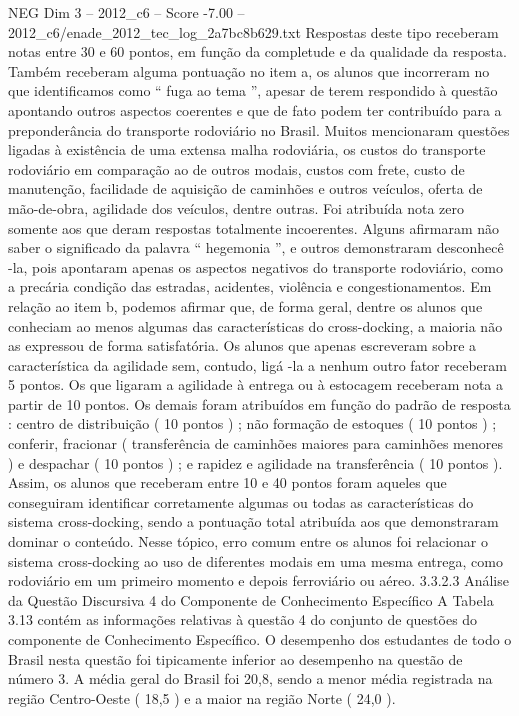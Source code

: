 \begin{textsample}{NEG Dim 3 – 2012\_c6 – Score -7.00 – 2012\_c6/enade\_2012\_tec\_log\_2a7bc8b629.txt}
Respostas deste tipo receberam notas entre 30 e 60 pontos, em função da completude e da qualidade da resposta.
Também receberam alguma pontuação no item a, os alunos que incorreram no que identificamos como “ fuga ao tema ”, apesar de terem respondido à questão apontando outros aspectos coerentes e que de fato podem ter contribuído para a preponderância do transporte rodoviário no Brasil.
Muitos mencionaram questões ligadas à existência de uma extensa malha rodoviária, os custos do transporte rodoviário em comparação ao de outros modais, custos com frete, custo de manutenção, facilidade de aquisição de caminhões e outros veículos, oferta de mão-de-obra, agilidade dos veículos, dentre outras.
Foi atribuída nota zero somente aos que deram respostas totalmente incoerentes.
Alguns afirmaram não saber o significado da palavra “ hegemonia ”, e outros demonstraram desconhecê -la, pois apontaram apenas os aspectos negativos do transporte rodoviário, como a precária condição das estradas, acidentes, violência e congestionamentos.
Em relação ao item b, podemos afirmar que, de forma geral, dentre os alunos que conheciam ao menos algumas das características do cross-docking, a maioria não as expressou de forma satisfatória.
Os alunos que apenas escreveram sobre a característica da agilidade sem, contudo, ligá -la a nenhum outro fator receberam 5 pontos.
Os que ligaram a agilidade à entrega ou à estocagem receberam nota a partir de 10 pontos.
Os demais foram atribuídos em função do padrão de resposta : centro de distribuição ( 10 pontos ) ; não formação de estoques ( 10 pontos ) ; conferir, fracionar ( transferência de caminhões maiores para caminhões menores ) e despachar ( 10 pontos ) ; e rapidez e agilidade na transferência ( 10 pontos ).
Assim, os alunos que receberam entre 10 e 40 pontos foram aqueles que conseguiram identificar corretamente algumas ou todas as características do sistema cross-docking, sendo a pontuação total atribuída aos que demonstraram dominar o conteúdo.
Nesse tópico, erro comum entre os alunos foi relacionar o sistema cross-docking ao uso de diferentes modais em uma mesma entrega, como rodoviário em um primeiro momento e depois ferroviário ou aéreo. 3.3.2.3 Análise da Questão Discursiva 4 do Componente de Conhecimento Específico A Tabela 3.13 contém as informações relativas à questão 4 do conjunto de questões do componente de Conhecimento Específico.
O desempenho dos estudantes de todo o Brasil nesta questão foi tipicamente inferior ao desempenho na questão de número 3.
A média geral do Brasil foi 20,8, sendo a menor média registrada na região Centro-Oeste ( 18,5 ) e a maior na região Norte ( 24,0 ).

\end{textsample}

